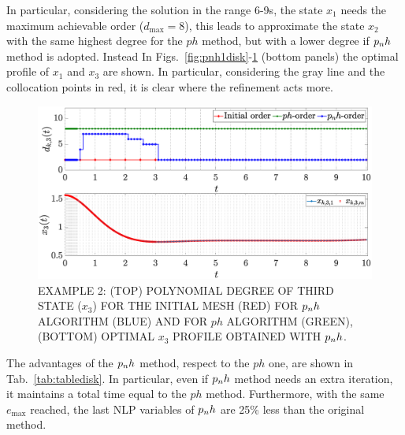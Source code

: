 In particular, considering the solution in the range 6-9s, the state $x_1$ needs the maximum achievable order ($d_\text{max} = 8$), this leads to approximate the state $x_2$ with the same highest degree for the $ph$ method, but with a lower degree if $p_{n}h$ method is adopted.
Instead In Figs.~\ref{fig:pnh1disk}-\ref{fig:pnh2disk} (bottom panels) the optimal profile of $x_1$ and $x_3$ are shown. In particular, considering the gray line and the collocation points in red, it is clear where the refinement acts more.
\begin{figure}[t]
	\centering
	\includegraphics[trim={1cm 0.1cm 2cm 1.05cm},clip,width=1.\columnwidth]{Img/pnh2_disk2}
	\caption{EXAMPLE 2: (TOP) POLYNOMIAL DEGREE OF THIRD STATE ($x_{3}$) FOR THE INITIAL MESH (RED) FOR $p_{n}h$ ALGORITHM (BLUE) AND FOR $ph$ ALGORITHM (GREEN), (BOTTOM)
	OPTIMAL $x_3$ PROFILE OBTAINED WITH $p_{n}h$.}
	\label{fig:pnh2disk}
\end{figure}
The advantages of the $p_{n}h$ method, respect to the $ph$ one, are shown in Tab.~\ref{tab:tabledisk}. In particular, even if $p_{n}h$ method needs an extra iteration, it maintains a total time equal to the $ph$ method. Furthermore, with the same $e_\text{max}$ reached, the last NLP variables of $p_{n}h$ are 25\% less than the original method.

